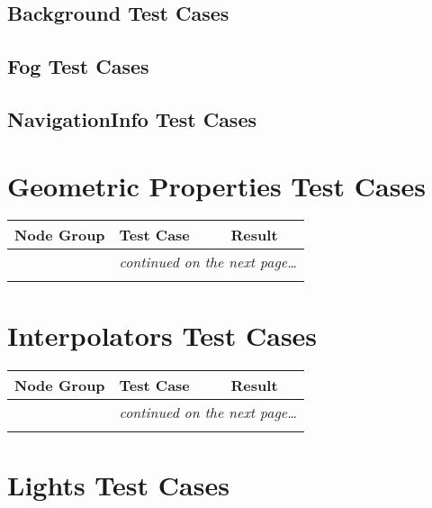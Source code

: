 \documentclass[12pt,letterpaper]{article}
\newcounter{testCaseCtr}
\newcommand{\resetTestCase}{\setcounter{testCaseCtr}{1}}
\begin{document}
\subsection{Background Test Cases}
\subsection{Fog Test Cases}
\subsection{NavigationInfo Test Cases}
\section{Geometric Properties Test Cases}
\resetTestCase

\begin{center}
\setlongtables
\begin{longtable}{|l|l|l|}
\hline
\textbf{Node Group} & \textbf{Test Case} & \textbf{Result} \\
\hline\hline
\endhead
\cline{2-3}
 & \multicolumn{2}{|r|}{\textsl{continued on the next page\ldots}} \\
\hline
\endfoot
\hline
\endlastfoot
& & \\
\cline{2-3}
\end{longtable}
\end{center}

\section{Interpolators Test Cases}
\resetTestCase

\begin{center}
\setlongtables
\begin{longtable}{|l|l|l|}
\hline
\textbf{Node Group} & \textbf{Test Case} & \textbf{Result} \\
\hline\hline
\endhead
\cline{2-3}
 & \multicolumn{2}{|r|}{\textsl{continued on the next page\ldots}} \\
\hline
\endfoot
\hline
\endlastfoot
& & \\
\cline{2-3}
\end{longtable}
\end{center}

\section{Lights Test Cases}
\resetTestCase
\end{document}
